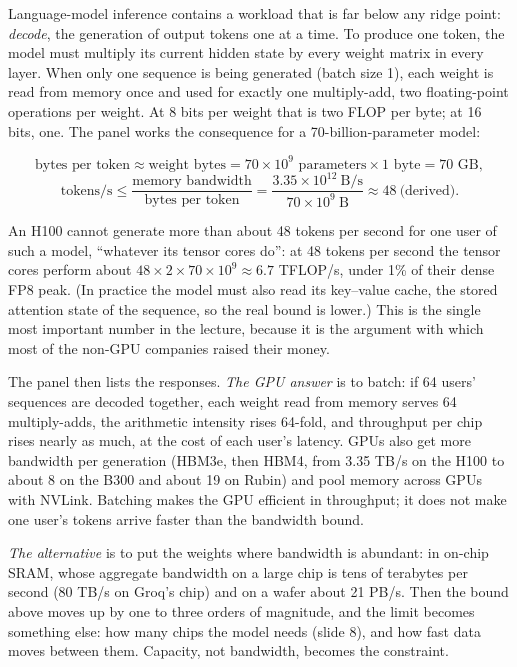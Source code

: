 \documentclass[11pt,letterpaper]{article}
\newenvironment{formulas}{\begin{tcolorbox}[formulabox]}{\end{tcolorbox}}
\begin{document}
Language-model inference contains a workload that is far below any ridge point: \emph{decode}, the generation of output tokens one at a time. To produce one token, the model must multiply its current hidden state by every weight matrix in every layer. When only one sequence is being generated (batch size 1), each weight is read from memory once and used for exactly one multiply-add, two floating-point operations per weight. At 8 bits per weight that is two FLOP per byte; at 16 bits, one. The panel works the consequence for a 70-billion-parameter model:
\begin{formulas}
\[ \text{bytes per token} \approx \text{weight bytes} = 70\times10^{9} \text{ parameters} \times 1 \text{ byte} = 70 \text{ GB}, \]
\[ \text{tokens/s} \le \frac{\text{memory bandwidth}}{\text{bytes per token}} = \frac{3.35\times10^{12}\ \text{B/s}}{70\times10^{9}\ \text{B}} \approx 48 \ \text{(derived)}. \]
\end{formulas}
An H100 cannot generate more than about 48 tokens per second for one user of such a model, ``whatever its tensor cores do'': at 48 tokens per second the tensor cores perform about $48 \times 2 \times 70\times10^9 \approx 6.7$ TFLOP/s, under 1\% of their dense FP8 peak. (In practice the model must also read its key--value cache, the stored attention state of the sequence, so the real bound is lower.) This is the single most important number in the lecture, because it is the argument with which most of the non-GPU companies raised their money.

The panel then lists the responses. \emph{The GPU answer} is to batch: if 64 users' sequences are decoded together, each weight read from memory serves 64 multiply-adds, the arithmetic intensity rises 64-fold, and throughput per chip rises nearly as much, at the cost of each user's latency. GPUs also get more bandwidth per generation (HBM3e, then HBM4, from 3.35 TB/s on the H100 to about 8 on the B300 and about 19 on Rubin) and pool memory across GPUs with NVLink. Batching makes the GPU efficient in throughput; it does not make one user's tokens arrive faster than the bandwidth bound.

\emph{The alternative} is to put the weights where bandwidth is abundant: in on-chip SRAM, whose aggregate bandwidth on a large chip is tens of terabytes per second (80 TB/s on Groq's chip) and on a wafer about 21 PB/s. Then the bound above moves up by one to three orders of magnitude, and the limit becomes something else: how many chips the model needs (slide 8), and how fast data moves between them. Capacity, not bandwidth, becomes the constraint.
\end{document}

